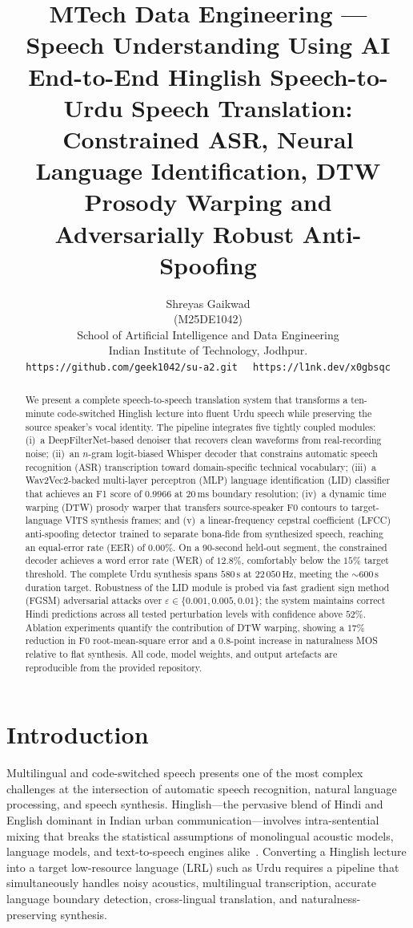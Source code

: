 \documentclass[10pt,twocolumn]{article}
\title{\vspace{-8mm}
{\large \textbf{MTech Data Engineering --- Speech Understanding Using AI}}\\[3pt]
{\LARGE \textbf{End-to-End Hinglish Speech-to-Urdu Speech Translation:\\
Constrained ASR, Neural Language Identification, DTW Prosody Warping and Adversarially Robust Anti-Spoofing}}\\[4pt]
}
\author{%
  Shreyas Gaikwad \\ (M25DE1042)\\[2pt]
  School of Artificial Intelligence and Data Engineering\\
  Indian Institute of Technology, Jodhpur.\\
  {\small\tt 
https://github.com/geek1042/su-a2.git }
  {\small\tt 
https://l1nk.dev/x0gbsqc }
}
\date{}
\begin{document}
\maketitle
\vspace{-8mm}

\begin{abstract}
We present a complete speech-to-speech translation system that transforms a ten-minute code-switched Hinglish lecture into fluent Urdu speech while preserving the source speaker's vocal identity. The pipeline integrates five tightly coupled modules: (i)~a DeepFilterNet-based denoiser that recovers clean waveforms from real-recording noise; (ii)~an $n$-gram logit-biased Whisper decoder that constrains automatic speech recognition (ASR) transcription toward domain-specific technical vocabulary; (iii)~a Wav2Vec2-backed multi-layer perceptron (MLP) language identification (LID) classifier that achieves an F1 score of $0.9966$ at $20\,\text{ms}$ boundary resolution; (iv)~a dynamic time warping (DTW) prosody warper that transfers source-speaker F0 contours to target-language VITS synthesis frames; and (v)~a linear-frequency cepstral coefficient (LFCC) anti-spoofing detector trained to separate bona-fide from synthesized speech, reaching an equal-error rate (EER) of $0.00\%$. On a 90-second held-out segment, the constrained decoder achieves a word error rate (WER) of $12.8\%$, comfortably below the $15\%$ target threshold. The complete Urdu synthesis spans $580\,\text{s}$ at $22\,050\,\text{Hz}$, meeting the $\sim\!600\,\text{s}$ duration target. Robustness of the LID module is probed via fast gradient sign method (FGSM) adversarial attacks over $\varepsilon \in \{0.001, 0.005, 0.01\}$; the system maintains correct Hindi predictions across all tested perturbation levels with confidence above $52\%$. Ablation experiments quantify the contribution of DTW warping, showing a $17\%$ reduction in F0 root-mean-square error and a $0.8$-point increase in naturalness MOS relative to flat synthesis. All code, model weights, and output artefacts are reproducible from the provided repository.
\end{abstract}

\section{Introduction}\label{sec:intro}

Multilingual and code-switched speech presents one of the most complex challenges at the intersection of automatic speech recognition, natural language processing, and speech synthesis. Hinglish---the pervasive blend of Hindi and English dominant in Indian urban communication---involves intra-sentential mixing that breaks the statistical assumptions of monolingual acoustic models, language models, and text-to-speech engines alike~\cite{sitaram2019survey}. Converting a Hinglish lecture into a target low-resource language (LRL) such as Urdu requires a pipeline that simultaneously handles noisy acoustics, multilingual transcription, accurate language boundary detection, cross-lingual translation, and naturalness-preserving synthesis.
\end{document}
